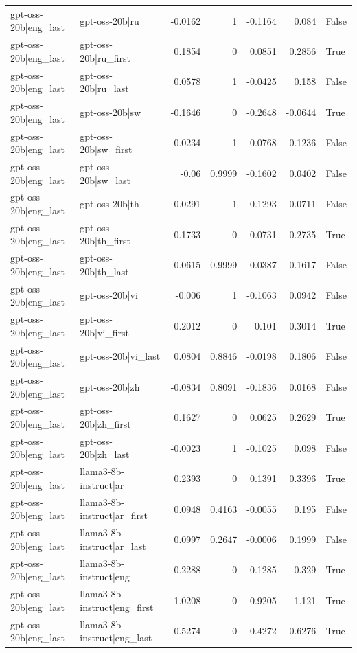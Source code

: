 \begin{table}
\begin{tabular}{l l r r r r l}
gpt-oss-20b|eng_last & gpt-oss-20b|ru & -0.0162 & 1 & -0.1164 & 0.084 & False \\
gpt-oss-20b|eng_last & gpt-oss-20b|ru_first & 0.1854 & 0 & 0.0851 & 0.2856 & True \\
gpt-oss-20b|eng_last & gpt-oss-20b|ru_last & 0.0578 & 1 & -0.0425 & 0.158 & False \\
gpt-oss-20b|eng_last & gpt-oss-20b|sw & -0.1646 & 0 & -0.2648 & -0.0644 & True \\
gpt-oss-20b|eng_last & gpt-oss-20b|sw_first & 0.0234 & 1 & -0.0768 & 0.1236 & False \\
gpt-oss-20b|eng_last & gpt-oss-20b|sw_last & -0.06 & 0.9999 & -0.1602 & 0.0402 & False \\
gpt-oss-20b|eng_last & gpt-oss-20b|th & -0.0291 & 1 & -0.1293 & 0.0711 & False \\
gpt-oss-20b|eng_last & gpt-oss-20b|th_first & 0.1733 & 0 & 0.0731 & 0.2735 & True \\
gpt-oss-20b|eng_last & gpt-oss-20b|th_last & 0.0615 & 0.9999 & -0.0387 & 0.1617 & False \\
gpt-oss-20b|eng_last & gpt-oss-20b|vi & -0.006 & 1 & -0.1063 & 0.0942 & False \\
gpt-oss-20b|eng_last & gpt-oss-20b|vi_first & 0.2012 & 0 & 0.101 & 0.3014 & True \\
gpt-oss-20b|eng_last & gpt-oss-20b|vi_last & 0.0804 & 0.8846 & -0.0198 & 0.1806 & False \\
gpt-oss-20b|eng_last & gpt-oss-20b|zh & -0.0834 & 0.8091 & -0.1836 & 0.0168 & False \\
gpt-oss-20b|eng_last & gpt-oss-20b|zh_first & 0.1627 & 0 & 0.0625 & 0.2629 & True \\
gpt-oss-20b|eng_last & gpt-oss-20b|zh_last & -0.0023 & 1 & -0.1025 & 0.098 & False \\
gpt-oss-20b|eng_last & llama3-8b-instruct|ar & 0.2393 & 0 & 0.1391 & 0.3396 & True \\
gpt-oss-20b|eng_last & llama3-8b-instruct|ar_first & 0.0948 & 0.4163 & -0.0055 & 0.195 & False \\
gpt-oss-20b|eng_last & llama3-8b-instruct|ar_last & 0.0997 & 0.2647 & -0.0006 & 0.1999 & False \\
gpt-oss-20b|eng_last & llama3-8b-instruct|eng & 0.2288 & 0 & 0.1285 & 0.329 & True \\
gpt-oss-20b|eng_last & llama3-8b-instruct|eng_first & 1.0208 & 0 & 0.9205 & 1.121 & True \\
gpt-oss-20b|eng_last & llama3-8b-instruct|eng_last & 0.5274 & 0 & 0.4272 & 0.6276 & True \\

\end{tabular}
\end{table}
